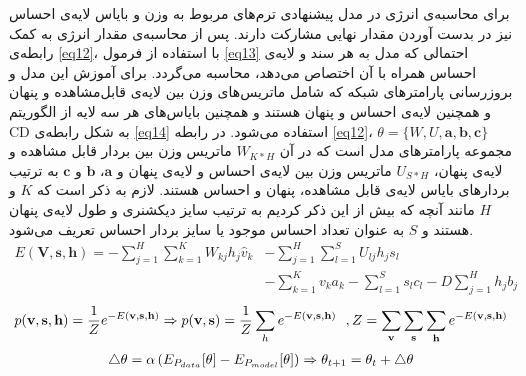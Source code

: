 \documentclass[12pt,a4paper]{article}
\begin{document}
برای محاسبه‌ی انرژی در مدل پیشنهادی ترم‌های مربوط به وزن و بایاس لایه‌ی احساس نیز در بدست آوردن مقدار نهایی مشارکت دارند. پس از محاسبه‌ی مقدار انرژی به کمک رابطه‌ی
\ref{eq12}،
با استفاده از فرمول
\ref{eq13}
	 احتمالی‌ که مدل به هر سند و ‌لایه‌ی احساس همراه با آن اختصاص می‌‌دهد، محاسبه می‌‌گردد. برای آموزش این مدل و بروزرسانی
پارامترهای شبکه که شامل ماتریس‌های وزن بین لایه‌ی قابل‌مشاهده و پنهان و همچنین لایه‌ی احساس و پنهان هستند و همچنین بایاس‌های هر سه‌ لایه از الگوریتم
CD
به شکل رابطه‌ی
\ref{eq14}
استفاده می‌‌شود. در رابطه
\ref{eq12}، $\theta=\{W, U, \textbf{a}, \textbf{b}, \textbf{c} \}$
مجموعه پارامتر‌های مدل است که در آن
$W_{K*H}$
ماتریس وزن بین بردار قابل مشاهده و لایه‌ی پنهان،
 $U_{S*H}$
ماتریس وزن بین لایه‌ی احساس و لایه‌ی پنهان و
$\textbf{a}$، $\textbf{b}$
و
$\textbf{c}$
به ترتیب بردار‌های بایاس لایه‌ی
قابل مشاهده، پنهان و احساس
هستند. لازم به ذکر است که
$K$
و
$H$
مانند آنچه که بیش از این ذکر کردیم به ترتیب سایز دیکشنری و طول لایه‌ی پنهان هستند و
$S$
به عنوان تعداد احساس موجود یا سایز بردار
احساس تعریف می‌‌شود.
\begin{align}
\label{eq12}
E(\textbf{V},\textbf{s},\textbf{h})=-\sum_{j=1}^{H}\sum_{k=1}^{K}W_{kj}h_j\hat{v}_{k}&-\sum_{j=1}^{H}\sum_{l=1}^{S}U_{lj}h_js_l\\\nonumber
&-\sum_{k=1}^{K}v_{k}a_{k} -\sum_{l=1}^{S}s_lc_l- D\sum_{j=1}^{H}h_jb_j
\end{align}
\begin{align}
\centering
\label{eq13}
p(\textbf{v},\textbf{s},\textbf{h}) = \dfrac{1}{Z} e^{-E(\textbf{v},\textbf{s},\textbf{h})} \Rightarrow
p(\textbf{v},\textbf{s}) = \dfrac{1}{Z} \sum_{h}  e^{-E(\textbf{v},\textbf{s},\textbf{h})} \ \ ,
Z = \sum_{\textbf{v}}\sum_{\textbf{s}}\sum_{\textbf{h}} e^{-E(\textbf{v},\textbf{s},\textbf{h})} 
\end{align}
\begin{align}
\centering
\label{eq14}
\triangle\theta = \alpha \left( E_{P_{data}}[\theta]-E_{P_{model}}[\theta]\right) \Rightarrow \theta_{t+1} = \theta_t + \triangle\theta
\end{align}
\end{document}
